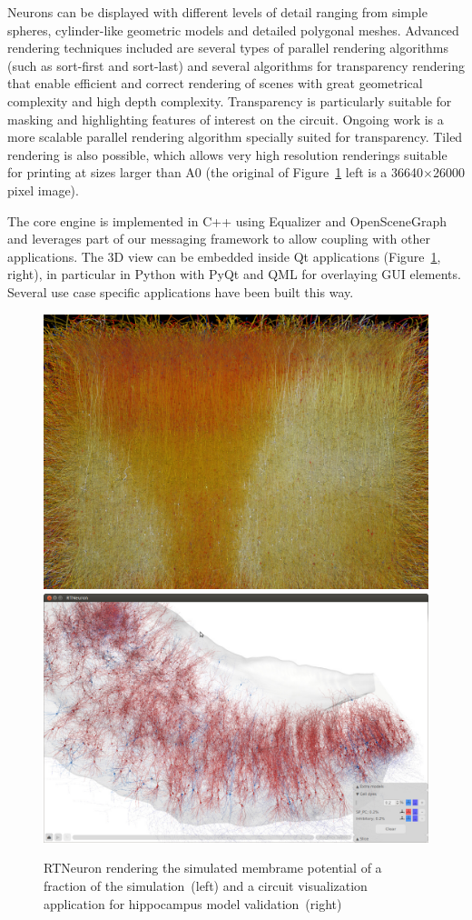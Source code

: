 \documentclass[10pt]{llncs}
\newcommand{\fig}[1]{Figure~\ref{#1}}
\begin{document}
Neurons can be displayed with different levels of detail ranging from simple
spheres, cylinder-like geometric models and detailed polygonal meshes. Advanced
rendering techniques included are several types of parallel rendering algorithms
(such as sort-first and sort-last) and several algorithms for transparency
rendering that enable efficient and correct rendering of scenes with great
geometrical complexity and high depth complexity. Transparency is particularly
suitable for masking and highlighting features of interest on the circuit.
Ongoing work is a more scalable parallel rendering algorithm specially suited
for transparency. Tiled rendering is also possible, which allows very high
resolution renderings suitable for printing at sizes larger than A0 (the
original of \fig{fRTNeuron} left is a 36640$\times$26000 pixel image).

The core engine is implemented in C++ using Equalizer and OpenSceneGraph and
leverages part of our messaging framework to allow coupling with other
applications. The 3D view can be embedded inside Qt applications
(\fig{fRTNeuron}, right), in particular in Python with PyQt and QML for
overlaying GUI elements. Several use case specific applications have been built
this way.

\begin{figure}[h!t]\center
  \includegraphics[width=.49\columnwidth]{images/rtneuron1}\hfil
  \includegraphics[width=.49\columnwidth]{images/rtneuron2}
  \caption{\label{fRTNeuron}RTNeuron rendering the simulated membrame potential of a fraction of the simulation~(left) and a circuit visualization application for hippocampus model validation~(right)}
\end{figure}
\end{document}
